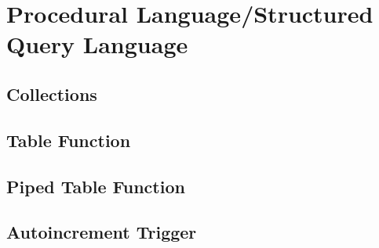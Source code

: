 \section[PLSQL]{Procedural Language/Structured Query Language}
\label{sec:plsql}

\subsection{Collections}
\label{sec:olap.collections}

\subsection{Table Function}
\label{sec:olap.table_function}

\subsection{Piped Table Function}
\label{sec:olap.piped_table_function}

\subsection{Autoincrement Trigger}
\label{sec:olap.autoincrement_trigger}

